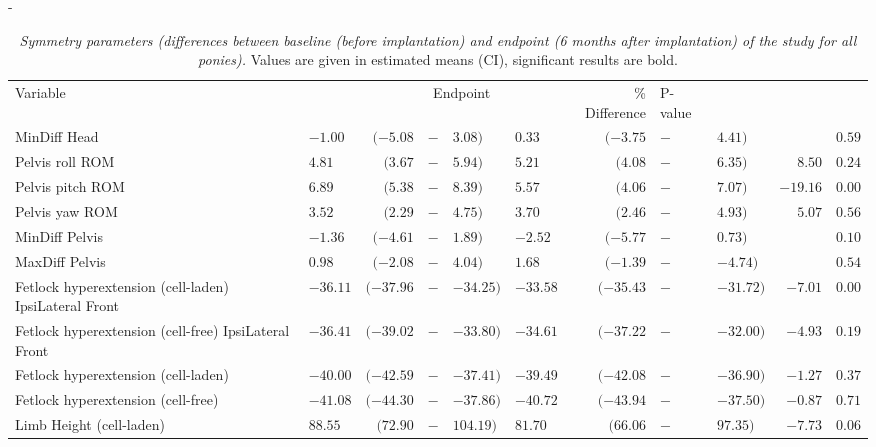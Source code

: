 \documentclass[twocolumn, empirical, authordate, issue]{jote-new-article}
\begin{document}
\begin{table}[ht!] 
\begin{adjustwidth}{-\fullwidthlen}{}
\caption{\emph{Symmetry parameters (differences between baseline (before implantation) and endpoint (6 months after implantation) of the study for all ponies).} Values are given in estimated means (CI), significant results are bold.}
\label{tab:table1}
\begin{tabularx}{\linewidth}{>{\raggedright}p{}>{\raggedleft\arraybackslash}Xrp{}l>{\raggedleft\arraybackslash}Xrp{}lrr}   \multicolumn{11}{c}{\cellcolor[HTML]{ffffff}}\\[-2ex]
\toprule Variable & \multicolumn{4}{c}{Baseline} & \multicolumn{4}{c}{Endpoint}  & \% Difference & P-value\tabularnewline \midrule  
MinDiff Head & $  -1.00$ & $ (-5.08$ & $-$ & $3.08)  $& $  0.33$ & $ (-3.75$ & $-$ & $4.41)  $& & $  0.59  $\tabularnewline Pelvis roll ROM & $ 4.81$ & $ (3.67$ & $-$ & $5.94)  $& $ 5.21$ & $ (4.08$ & $-$ & $6.35)  $&$  8.50 $& $  0.24  $ \tabularnewline
Pelvis pitch ROM &  $\mathbf{ 6.89}$ & $\mathbf{ (5.38}$ & $\mathbf{-}$ & $\mathbf{8.39)  }$& $\mathbf{ 5.57}$ & $\mathbf{ (4.06}$ & $\mathbf{-}$ & $\mathbf{7.07)  }$& $\mathbf{  -19.16 }$ & $\mathbf{  0.00  }$ \tabularnewline 
Pelvis yaw ROM & $ 3.52$ & $ (2.29$ & $-$ & $4.75)  $& $ 3.70$ & $ (2.46$ & $-$ & $4.93)  $& $  5.07 $& $  0.56  $\tabularnewline 
MinDiff Pelvis & $  -1.36$ & $ (-4.61$ & $-$ & $1.89)  $& $  -2.52$ & $ (-5.77$ & $-$ & $0.73)  $& &$  0.10  $\tabularnewline MaxDiff Pelvis & $ 0.98$ & $ (-2.08$ & $-$ & $4.04)  $& $ 1.68$ & $ (-1.39$ & $-$ & $-4.74)  $& &$  0.54  $\tabularnewline
Fetlock hyperextension (cell-laden)  IpsiLateral Front & $  -36.11$ & $ (-37.96$ & $-$ & $-34.25)  $& $  -33.58$ & $ (-35.43$ & $-$ & $-31.72)  $& $  -7.01 $& $  0.00  $\tabularnewline
Fetlock hyperextension (cell-free) IpsiLateral Front & $\mathbf{  -36.41}$ & $\mathbf{ (-39.02}$ & $\mathbf{-}$ & $\mathbf{-33.80)  }$& $\mathbf{  -34.61}$ & $\mathbf{ (-37.22}$ & $\mathbf{-}$ & $\mathbf{-32.00)  }$& $\mathbf{  -4.93 }$& $\mathbf{  0.19  }$\tabularnewline
Fetlock hyperextension (cell-laden) & $  -40.00$ & $ (-42.59$ & $-$ & $-37.41)  $& $  -39.49$ & $ (-42.08$ & $-$ & $-36.90) $& $  -1.27 $ & $  0.37  $\tabularnewline
Fetlock hyperextension (cell-free) & $  -41.08$ & $ (-44.30$ & $-$ & $-37.86)  $& $  -40.72$ & $ (-43.94$ & $-$ & $-37.50)  $& $  -0.87 $& $  0.71  $\tabularnewline
Limb Height (cell-laden) & $ 88.55$ & $ (72.90$ & $-$ & $104.19)  $& $ 81.70$ & $ (66.06$ & $-$ & $97.35)  $& $  -7.73 $& $  0.06  $\tabularnewline

\end{tabularx}
\end{adjustwidth}
\end{table}
\end{document}
